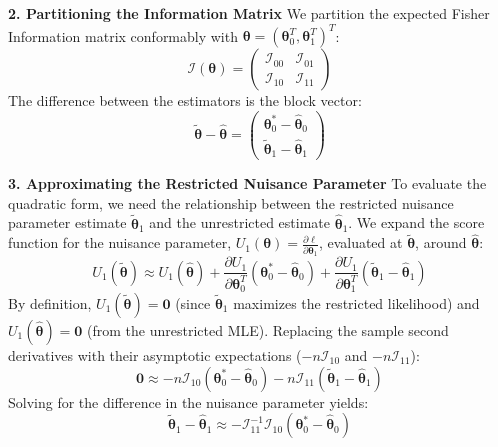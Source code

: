 \documentclass[
  letterpaper,
  DIV=11,
  numbers=noendperiod]{scrreprt}
\renewcommand{\[}{\begin{equation}}
\renewcommand{\]}{\end{equation}}
\theoremstyle{definition}
\theoremstyle{plain}
\theoremstyle{plain}
\theoremstyle{plain}
\theoremstyle{definition}
\theoremstyle{plain}
\theoremstyle{remark}
\begin{document}
\textbf{2. Partitioning the Information Matrix} We partition the
expected Fisher Information matrix conformably with
\(\boldsymbol{\theta} = (\boldsymbol{\theta}_0^T, \boldsymbol{\theta}_1^T)^T\):
\[\mathcal{I}(\boldsymbol{\theta}) = \begin{pmatrix} \mathcal{I}_{00} & \mathcal{I}_{01} \\ \mathcal{I}_{10} & \mathcal{I}_{11} \end{pmatrix}\]
The difference between the estimators is the block vector:
\[\tilde{\boldsymbol{\theta}} - \hat{\boldsymbol{\theta}} = \begin{pmatrix} \boldsymbol{\theta}_0^* - \hat{\boldsymbol{\theta}}_0 \\ \tilde{\boldsymbol{\theta}}_1 - \hat{\boldsymbol{\theta}}_1 \end{pmatrix}\]

\textbf{3. Approximating the Restricted Nuisance Parameter} To evaluate
the quadratic form, we need the relationship between the restricted
nuisance parameter estimate \(\tilde{\boldsymbol{\theta}}_1\) and the
unrestricted estimate \(\hat{\boldsymbol{\theta}}_1\). We expand the
score function for the nuisance parameter,
\(U_1(\boldsymbol{\theta}) = \frac{\partial \ell}{\partial \boldsymbol{\theta}_1}\),
evaluated at \(\tilde{\boldsymbol{\theta}}\), around
\(\hat{\boldsymbol{\theta}}\):
\[U_1(\tilde{\boldsymbol{\theta}}) \approx U_1(\hat{\boldsymbol{\theta}}) + \frac{\partial U_1}{\partial \boldsymbol{\theta}_0^T} (\boldsymbol{\theta}_0^* - \hat{\boldsymbol{\theta}}_0) + \frac{\partial U_1}{\partial \boldsymbol{\theta}_1^T} (\tilde{\boldsymbol{\theta}}_1 - \hat{\boldsymbol{\theta}}_1)\]
By definition, \(U_1(\tilde{\boldsymbol{\theta}}) = \mathbf{0}\) (since
\(\tilde{\boldsymbol{\theta}}_1\) maximizes the restricted likelihood)
and \(U_1(\hat{\boldsymbol{\theta}}) = \mathbf{0}\) (from the
unrestricted MLE). Replacing the sample second derivatives with their
asymptotic expectations (\(-n\mathcal{I}_{10}\) and
\(-n\mathcal{I}_{11}\)):
\[\mathbf{0} \approx -n\mathcal{I}_{10}(\boldsymbol{\theta}_0^* - \hat{\boldsymbol{\theta}}_0) - n\mathcal{I}_{11}(\tilde{\boldsymbol{\theta}}_1 - \hat{\boldsymbol{\theta}}_1)\]
Solving for the difference in the nuisance parameter yields:
\[\tilde{\boldsymbol{\theta}}_1 - \hat{\boldsymbol{\theta}}_1 \approx -\mathcal{I}_{11}^{-1} \mathcal{I}_{10} (\boldsymbol{\theta}_0^* - \hat{\boldsymbol{\theta}}_0)\]
\end{document}

